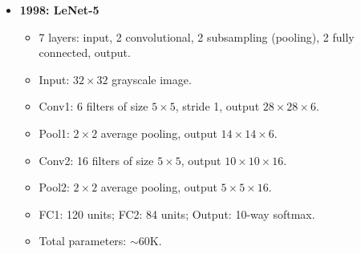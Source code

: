 \documentclass{article}
\begin{document}
\begin{itemize}[leftmargin=1.5em]
  \item \textbf{1998: LeNet-5}
\begin{itemize}
    \item 7 layers: input, 2 convolutional, 2 subsampling (pooling), 2 fully connected, output.
    \item Input: $32 \times 32$ grayscale image.
    \item Conv1: 6 filters of size $5 \times 5$, stride 1, output $28 \times 28 \times 6$.
    \item Pool1: $2 \times 2$ average pooling, output $14 \times 14 \times 6$.
    \item Conv2: 16 filters of size $5 \times 5$, output $10 \times 10 \times 16$.
    \item Pool2: $2 \times 2$ average pooling, output $5 \times 5 \times 16$.
    \item FC1: 120 units; FC2: 84 units; Output: 10-way softmax.
    \item Total parameters: $\sim$60K.
\end{itemize}
  

\end{itemize}
\end{document}
